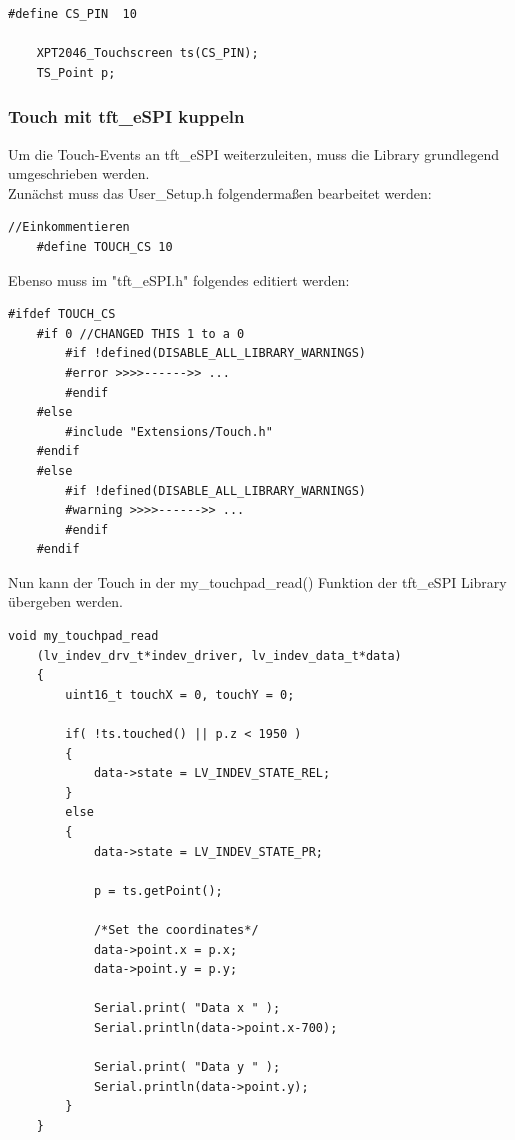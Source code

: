 \begin{lstlisting}[style=cppCode]
    #define CS_PIN  10

    XPT2046_Touchscreen ts(CS_PIN);
    TS_Point p;
\end{lstlisting}

            \subsubsection{Touch mit tft\_eSPI kuppeln} \label{touch_to_tft}
            Um die Touch-Events an tft\_eSPI weiterzuleiten, muss die Library grundlegend \\ 
            umgeschrieben werden.\\
            Zunächst muss das User\_Setup.h folgendermaßen bearbeitet werden:

\begin{lstlisting}[style=cppCode]
    //Einkommentieren
    #define TOUCH_CS 10 
\end{lstlisting}

            
            \begin{minipage}{\linewidth}
            Ebenso muss im "tft\_eSPI.h" folgendes editiert werden:
\begin{lstlisting}[style=cppCode]
    #ifdef TOUCH_CS
    #if 0 //CHANGED THIS 1 to a 0
        #if !defined(DISABLE_ALL_LIBRARY_WARNINGS)
        #error >>>>------>> ...
        #endif
    #else
        #include "Extensions/Touch.h"
    #endif
    #else
        #if !defined(DISABLE_ALL_LIBRARY_WARNINGS)
        #warning >>>>------>> ...
        #endif
    #endif
\end{lstlisting}\end{minipage}
            
            

            \begin{minipage}{\linewidth}
            Nun kann der Touch in der my\_touchpad\_read() Funktion der tft\_eSPI Library
            übergeben werden.
            \begin{lstlisting}[style=cppCode]
    void my_touchpad_read
    (lv_indev_drv_t*indev_driver, lv_indev_data_t*data)
    {
        uint16_t touchX = 0, touchY = 0;
    
        if( !ts.touched() || p.z < 1950 )
        {
            data->state = LV_INDEV_STATE_REL;
        }
        else
        {
            data->state = LV_INDEV_STATE_PR;
    
            p = ts.getPoint();

            /*Set the coordinates*/
            data->point.x = p.x;
            data->point.y = p.y;
    
            Serial.print( "Data x " );
            Serial.println(data->point.x-700);
    
            Serial.print( "Data y " );
            Serial.println(data->point.y);
        }
    }
            \end{lstlisting}\end{minipage}

